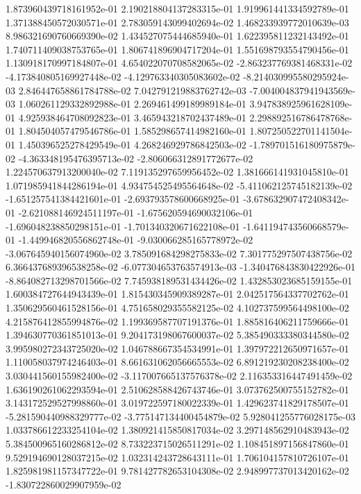 1.873960439718161952e-01
2.190218804137283315e-01
1.919961441334592789e-01
1.371388450572030571e-01
2.783059143099402694e-02
1.468233939772010639e-03
8.986321690760669390e-02
1.434527075444685940e-01
1.622395811232143492e-01
1.740711409038753765e-01
1.806741896904717204e-01
1.551698793554790456e-01
1.130918170997184807e-01
4.654022070708582065e-02
-2.863237769381468331e-02
-4.173840805169927448e-02
-4.129763340305083602e-02
-8.214030995580295924e-03
2.846447658861784788e-02
7.042791219883762742e-03
-7.004004837941943569e-03
1.060261129332892988e-01
2.269461499189989184e-01
3.947838925961628109e-01
4.925938464708092823e-01
3.465943218702437489e-01
2.298892516786478768e-01
1.804504057479546786e-01
1.585298657414982160e-01
1.807250522701141504e-01
1.450396525278429549e-01
4.268246929786842503e-02
-1.789701516180975879e-02
-4.363348195476395713e-02
-2.806066312891772677e-02
1.224570637913200040e-02
7.119135297659956452e-02
1.381666141931045810e-01
1.071985941844286194e-01
4.934754525495564648e-02
-5.411062125745182139e-02
-1.651257541384421601e-01
-2.693793578600668925e-01
-3.678632907472408342e-01
-2.621088146924511197e-01
-1.675620594690032106e-01
-1.696048238850298151e-01
-1.701340320671622108e-01
-1.641194743560668579e-01
-1.449946820556862748e-01
-9.030066285165778972e-02
-3.067645940156074960e-02
3.785091684298275833e-02
7.301775297507438756e-02
6.366437689396538258e-02
-6.077304653763574913e-03
-1.340476843830422926e-01
-8.864082713298701566e-02
7.745938189531434426e-02
1.432853023685159155e-01
1.600384727644943439e-01
1.815430345909389287e-01
2.042517564337702762e-01
1.350629560461528156e-01
4.751658029355582125e-02
4.102737599564498100e-02
4.215876412855994876e-02
1.199369587707191376e-01
1.885816406211759666e-01
1.394630770361851013e-01
9.204173198067600037e-02
5.385490333380344580e-02
3.995980272343725020e-02
1.046788667354534991e-01
1.397972212650971657e-01
1.110058037974246403e-01
8.661631062056665553e-02
6.891219230208238400e-02
3.030441560155982400e-02
-3.117007665137576378e-02
2.116353316447491459e-02
1.636190261062293594e-01
2.510628588426743746e-01
3.073762500755152782e-01
3.143172529527998860e-01
3.019722597180022339e-01
1.429623741829178507e-01
-5.281590440988329777e-02
-3.775147134400454879e-02
5.928041255776028175e-03
1.033786612233254104e-02
1.380921415850817034e-02
3.297148562910483943e-02
5.384500965160286812e-02
8.733223715026511291e-02
1.108451897156847860e-01
9.529194690128037215e-02
1.032314243728643111e-01
1.706104157810726107e-01
1.825981981157347722e-01
9.781427782653104308e-02
2.948997737013420162e-02
-1.830722860029907959e-02
